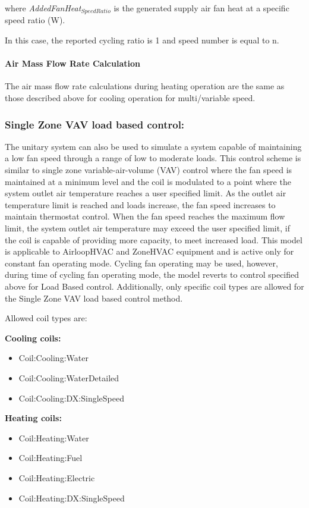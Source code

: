 where \emph{AddedFanHeat\(_{SpeedRatio}\)} is the generated supply air fan heat at a specific speed ratio (W).

In this case, the reported cycling ratio is 1 and speed number is equal to n.

\paragraph{Air Mass Flow Rate Calculation}\label{air-mass-flow-rate-calculation-1}

The air mass flow rate calculations during heating operation are the same as those described above for cooling operation for multi/variable speed.

\subsubsection{Single Zone VAV load based control:}\label{ashrae-901-load-based-control}

The unitary system can also be used to simulate a system capable of maintaining a low fan speed through a range of low to moderate loads. This control scheme is similar to single zone variable-air-volume (VAV) control where the fan speed is maintained at a minimum level and the coil is modulated to a point where the system outlet air temperature reaches a user specified limit. As the outlet air temperature limit is reached and loads increase, the fan speed increases to maintain thermostat control. When the fan speed reaches the maximum flow limit, the system outlet air temperature may exceed the user specified limit, if the coil is capable of providing more capacity, to meet increased load. This model is applicable to AirloopHVAC and ZoneHVAC equipment and is active only for constant fan operating mode. Cycling fan operating may be used, however, during time of cycling fan operating mode, the model reverts to control specified above for Load Based control. Additionally, only specific coil types are allowed for the Single Zone VAV load based control method.

Allowed coil types are:

\textbf{Cooling coils:}
\begin{itemize}
\item Coil:Cooling:Water
\item Coil:Cooling:WaterDetailed
\item Coil:Cooling:DX:SingleSpeed
\end{itemize}

\textbf{Heating coils:}
\begin{itemize}
\item Coil:Heating:Water
\item Coil:Heating:Fuel
\item Coil:Heating:Electric
\item Coil:Heating:DX:SingleSpeed
\end{itemize}


